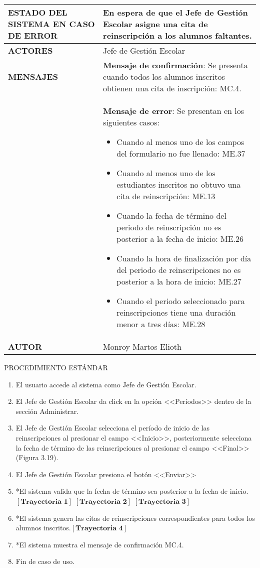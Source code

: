 \begin{longtable}{ | p{6cm} | p{10cm} |}
    \textbf{ESTADO DEL SISTEMA EN CASO DE ERROR} &  En espera de que el Jefe de Gestión Escolar asigne una cita de reinscripción a los alumnos faltantes.\\
    \hline
    \textbf{ACTORES} & Jefe de Gestión Escolar\\
    \hline
    \textbf{MENSAJES} & \textbf{Mensaje de confirmación}: Se presenta cuando todos los alumnos inscritos obtienen una cita de inscripción: MC.4.\\&\textbf{Mensaje de error}: Se presentan en los siguientes casos:
    \begin{itemize}
    \item Cuando al menos uno de los campos del formulario no fue llenado: ME.37
\item Cuando al menos uno de los estudiantes inscritos no obtuvo una cita de reinscripción: ME.13
\item Cuando la fecha de término del periodo de reinscripción no es posterior a la fecha de inicio: ME.26
\item Cuando la hora de finalización por día del periodo de reinscripciones no es posterior a la hora de inicio: ME.27
\item Cuando el periodo seleccionado para reinscripciones tiene una duración menor a tres días: ME.28
\end{itemize}\\
    \hline
    \textbf{AUTOR} & Monroy Martos Elioth\\
    \hline
\end{longtable}
\vspace*{1cm}
\noindent
\Large{PROCEDIMIENTO ESTÁNDAR}
\large{}
\begin{enumerate}
    \item El usuario accede al sistema como Jefe de Gestión Escolar.
	\item El Jefe de Gestión Escolar da click en la opción <<Períodos>> dentro de la sección Administrar.
	\item El Jefe de Gestión Escolar selecciona el período de inicio de las reinscripciones al presionar el campo <<Inicio>>, posteriormente selecciona la fecha de término de las reinscripciones al presionar el campo <<Final>> (Figura 3.19).
	\item El Jefe de Gestión Escolar presiona el botón <<Enviar>>
	\item *El sistema valida que la fecha de término sea posterior a la fecha de inicio.\\$\left[\textbf{Trayectoria 1}\right]$
	$\left[\textbf{Trayectoria 2}\right]$
	$\left[\textbf{Trayectoria 3}\right]$
	\item *El sistema genera las citas de reinscripciones correspondientes para todos los alumnos inscritos.$\left[\textbf{Trayectoria 4}\right]$
	\item *El sistema muestra el mensaje de confirmación MC.4.
	\item Fin de caso de uso.
\end{enumerate}

